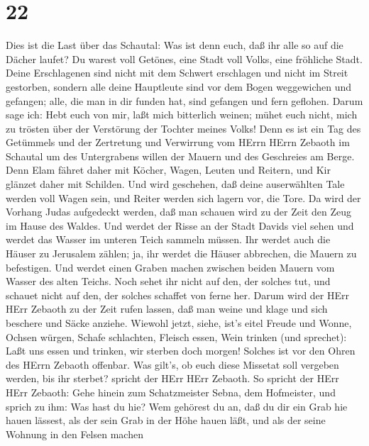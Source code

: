 \hypertarget{section-21}{%
\section{22}\label{section-21}}

 Dies ist die Last über das Schautal: Was ist denn euch, daß
ihr alle so auf die Dächer laufet?  Du warest voll Getönes,
eine Stadt voll Volks, eine fröhliche Stadt. Deine Erschlagenen sind
nicht mit dem Schwert erschlagen und nicht im Streit gestorben,
 sondern alle deine Hauptleute sind vor dem Bogen
weggewichen und gefangen; alle, die man in dir funden hat, sind gefangen
und fern geflohen.  Darum sage ich: Hebt euch von mir, laßt
mich bitterlich weinen; mühet euch nicht, mich zu trösten über der
Verstörung der Tochter meines Volks!  Denn es ist ein Tag
des Getümmels und der Zertretung und Verwirrung vom HErrn HErrn Zebaoth
im Schautal um des Untergrabens willen der Mauern und des Geschreies am
Berge.  Denn Elam fähret daher mit Köcher, Wagen, Leuten und
Reitern, und Kir glänzet daher mit Schilden.  Und wird
geschehen, daß deine auserwählten Tale werden voll Wagen sein, und
Reiter werden sich lagern vor, die Tore.  Da wird der
Vorhang Judas aufgedeckt werden, daß man schauen wird zu der Zeit den
Zeug im Hause des Waldes.  Und werdet der Risse an der Stadt
Davids viel sehen und werdet das Wasser im unteren Teich sammeln müssen.
 Ihr werdet auch die Häuser zu Jerusalem zählen; ja, ihr
werdet die Häuser abbrechen, die Mauern zu befestigen.  Und
werdet einen Graben machen zwischen beiden Mauern vom Wasser des alten
Teichs. Noch sehet ihr nicht auf den, der solches tut, und schauet nicht
auf den, der solches schaffet von ferne her.  Darum wird
der HErr HErr Zebaoth zu der Zeit rufen lassen, daß man weine und klage
und sich beschere und Säcke anziehe.  Wiewohl jetzt, siehe,
ist's eitel Freude und Wonne, Ochsen würgen, Schafe schlachten, Fleisch
essen, Wein trinken (und sprechet): Laßt uns essen und trinken, wir
sterben doch morgen!  Solches ist vor den Ohren des HErrn
Zebaoth offenbar. Was gilt's, ob euch diese Missetat soll vergeben
werden, bis ihr sterbet? spricht der HErr HErr Zebaoth.  So
spricht der HErr HErr Zebaoth: Gehe hinein zum Schatzmeister Sebna, dem
Hofmeister, und sprich zu ihm:  Was hast du hie? Wem
gehörest du an, daß du dir ein Grab hie hauen lässest, als der sein Grab
in der Höhe hauen läßt, und als der seine Wohnung in den Felsen machen
